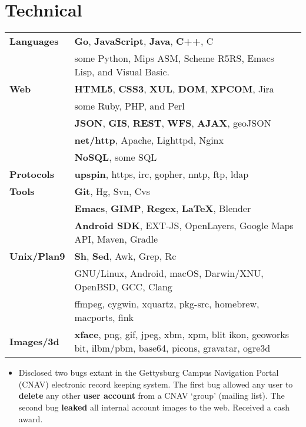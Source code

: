 \documentclass[11pt]{article}
\begin{document}
\section*{Technical}
\begin{tabular}{ l l }
  	\textbf{Languages} & \textbf{Go}, \textbf{JavaScript}, \textbf{Java}, \textbf{C++}, C \\
  	& some Python, Mips ASM, Scheme R5RS, Emacs Lisp, and  Visual Basic. \\
  	
  	\textbf{Web} & \textbf{HTML5}, \textbf{CSS3}, \textbf{XUL}, \textbf{DOM}, \textbf{XPCOM}, Jira \\
  	& some Ruby, PHP, and Perl \\
  	& \textbf{JSON}, \textbf{GIS}, \textbf{REST}, \textbf{WFS}, \textbf{AJAX}, geoJSON \\
  	& \textbf{net/http}, Apache, Lighttpd, Nginx \\
  	& \textbf{NoSQL}, some SQL \\
  	\textbf{Protocols} & \textbf{upspin}, https, irc, gopher, nntp, ftp, ldap \\
  	
  	\textbf{Tools} & \textbf{Git}, Hg, Svn, Cvs \\
  	& \textbf{Emacs}, \textbf{GIMP}, \textbf{Regex}, \textbf{\LaTeX}, Blender \\
  	& \textbf{Android SDK}, EXT-JS, OpenLayers, Google Maps API, Maven, Gradle \\
  	
  	\textbf{Unix/Plan9} & \textbf{Sh}, \textbf{Sed}, Awk, Grep, Rc \\
  	& GNU/Linux, Android, macOS, Darwin/XNU, OpenBSD, GCC, Clang \\
  	& ffmpeg, cygwin, xquartz, pkg-src, homebrew, macports, fink \\
  	\textbf{Images/3d} & \textbf{xface}, png, gif, jpeg, xbm, xpm, blit ikon, geoworks bit, ilbm/pbm, base64, picons, gravatar, ogre3d \\
\end{tabular}
\begin{itemize}
	\item Disclosed two bugs extant in the Gettysburg Campus Navigation Portal (CNAV) electronic record keeping system. The first bug allowed any user to \textbf{delete} any other \textbf{user account} from a CNAV `group' (mailing list). The second bug \textbf{leaked} all internal account images to the web. Received a cash award.
\end{itemize}
\end{document}
